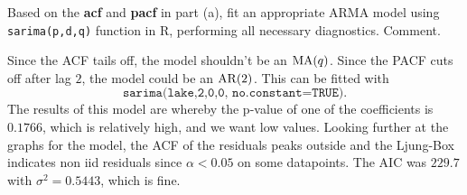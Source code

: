 Based on the \textbf{acf} and \textbf{pacf} in part (a), fit an appropriate ARMA model using \texttt{sarima(p,d,q)} function in R, performing all necessary diagnostics. Comment.

\nl Since the ACF tails off, the model shouldn't be an $\operatorname{MA}(q)$. Since the PACF cuts off after lag $2$, the model could be an $\operatorname{AR}(2)$. This can be fitted with
$$\texttt{sarima(lake,2,0,0, no.constant=TRUE)}.$$
The results of this model are 
whereby the p-value of one of the coefficients is $0.1766$, which is relatively high, and we want low values. Looking further at the graphs for the model, the ACF of the residuals peaks outside and the Ljung-Box indicates non iid residuals since $\alpha < 0.05$ on some datapoints. The AIC was $229.7$ with $\sigma^2 = 0.5443$, which is fine. 


